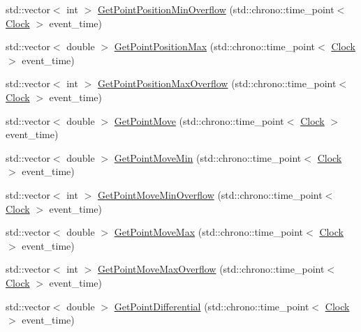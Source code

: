 \begin{DoxyCompactItemize}
\item 
std\+::vector$<$ int $>$ \mbox{\hyperlink{classPoint_a3a0caf079555585799754b3cab12129c}{Get\+Point\+Position\+Min\+Overflow}} (std\+::chrono\+::time\+\_\+point$<$ \mbox{\hyperlink{universe_8h_a0ef8d951d1ca5ab3cfaf7ab4c7a6fd80}{Clock}} $>$ event\+\_\+time)
\item 
std\+::vector$<$ double $>$ \mbox{\hyperlink{classPoint_afca47c5ea265894faf7b6aa4f4b17998}{Get\+Point\+Position\+Max}} (std\+::chrono\+::time\+\_\+point$<$ \mbox{\hyperlink{universe_8h_a0ef8d951d1ca5ab3cfaf7ab4c7a6fd80}{Clock}} $>$ event\+\_\+time)
\item 
std\+::vector$<$ int $>$ \mbox{\hyperlink{classPoint_a228830fddb8b4d90e910e0774796e635}{Get\+Point\+Position\+Max\+Overflow}} (std\+::chrono\+::time\+\_\+point$<$ \mbox{\hyperlink{universe_8h_a0ef8d951d1ca5ab3cfaf7ab4c7a6fd80}{Clock}} $>$ event\+\_\+time)
\item 
std\+::vector$<$ double $>$ \mbox{\hyperlink{classPoint_a46d06a6d5e8107a0321ede4ca162f264}{Get\+Point\+Move}} (std\+::chrono\+::time\+\_\+point$<$ \mbox{\hyperlink{universe_8h_a0ef8d951d1ca5ab3cfaf7ab4c7a6fd80}{Clock}} $>$ event\+\_\+time)
\item 
std\+::vector$<$ double $>$ \mbox{\hyperlink{classPoint_a92d41c8cd9a07ef56223839a44f54fe8}{Get\+Point\+Move\+Min}} (std\+::chrono\+::time\+\_\+point$<$ \mbox{\hyperlink{universe_8h_a0ef8d951d1ca5ab3cfaf7ab4c7a6fd80}{Clock}} $>$ event\+\_\+time)
\item 
std\+::vector$<$ int $>$ \mbox{\hyperlink{classPoint_a3c88bb9f80535e98fb0f479b69f75c64}{Get\+Point\+Move\+Min\+Overflow}} (std\+::chrono\+::time\+\_\+point$<$ \mbox{\hyperlink{universe_8h_a0ef8d951d1ca5ab3cfaf7ab4c7a6fd80}{Clock}} $>$ event\+\_\+time)
\item 
std\+::vector$<$ double $>$ \mbox{\hyperlink{classPoint_af67ce3da60a8e3907df6ec193786c2ae}{Get\+Point\+Move\+Max}} (std\+::chrono\+::time\+\_\+point$<$ \mbox{\hyperlink{universe_8h_a0ef8d951d1ca5ab3cfaf7ab4c7a6fd80}{Clock}} $>$ event\+\_\+time)
\item 
std\+::vector$<$ int $>$ \mbox{\hyperlink{classPoint_a83e3715d429ab2099f0c421d46603004}{Get\+Point\+Move\+Max\+Overflow}} (std\+::chrono\+::time\+\_\+point$<$ \mbox{\hyperlink{universe_8h_a0ef8d951d1ca5ab3cfaf7ab4c7a6fd80}{Clock}} $>$ event\+\_\+time)
\item 
std\+::vector$<$ double $>$ \mbox{\hyperlink{classPoint_af3941d62b39234e468e201f25a37d9da}{Get\+Point\+Differential}} (std\+::chrono\+::time\+\_\+point$<$ \mbox{\hyperlink{universe_8h_a0ef8d951d1ca5ab3cfaf7ab4c7a6fd80}{Clock}} $>$ event\+\_\+time)

\end{DoxyCompactItemize}
